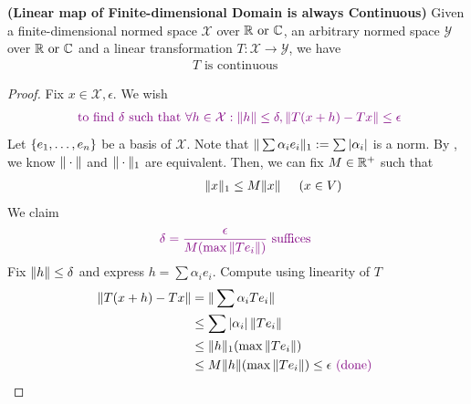 \documentclass{report}
\begin{document}
\begin{theorem}
\label{LmoF}
\textbf{(Linear map of Finite-dimensional Domain is always Continuous)} Given a finite-dimensional normed space $\mathcal{X}$ over $\mathbb{R}\text{ or }\mathbb{C}$, an arbitrary normed space  $\mathcal{Y}$ over $\mathbb{R}\text{ or }\mathbb{C}$ and a linear transformation  $T:\mathcal{X}\rightarrow \mathcal{Y}$, we have 
\begin{align*}
T\text{ is continuous }
\end{align*}
\end{theorem}
\begin{proof}
Fix $x\in \mathcal{X},\epsilon $. We wish 
\begin{align*}
\textcolor{violet}{\text{ to find $\delta$ such that }\forall h\in \mathcal{X}: \| h \|\leq \delta, \| T(x+h)-Tx \|\leq \epsilon }
\end{align*}
Let $\{ e_1,\dots ,e_n \}$ be a basis of $\mathcal{X}$. Note that $ \|  \sum \alpha_i e_i  \|_1: = \sum \left|\alpha _i\right|$ is a norm. By , we know $\| \cdot \|$ and $\| \cdot \|_1$ are equivalent. Then, we can fix $M\in\mathbb{R}^+$ such that 
\begin{align*}
\hspace{2cm}\| x \|_1 \leq M\| x \|\hspace{0.5cm}(x \in V)
\end{align*}
We claim 
\begin{align*}
\textcolor{violet}{\delta= \frac{\epsilon }{M(\max \| Te_i \| )}\text{ suffices }} 
\end{align*}
Fix $\| h \|\leq \delta$ and express $h=\sum \alpha_i e_i$. Compute using linearity of $T$
\begin{align*}
  \| T(x+h)-Tx \|&=\| \sum \alpha_i T e_i \|\\
  &\leq \sum \left|\alpha _i\right| \| Te_i \|\\
  &\leq  \| h \|_1 (\max \| Te_i \| )\\
  &\leq M \| h \|(\max \| Te_i \|)\leq \epsilon \textcolor{violet}{\text{ (done) }}
\end{align*}
\end{proof}
\end{document}
